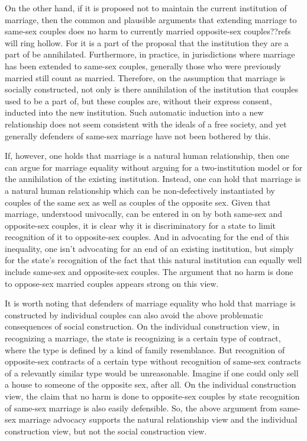 On the other hand, if it is proposed not to maintain the current institution of marriage, then the common and plausible
arguments that extending marriage to same-sex couples does no harm to currently married opposite-sex couples??refs will ring hollow. For it is a part of the proposal that the
institution they are a part of be annihilated. Furthermore, in practice, in jurisdictions where marriage has been extended to same-sex couples, generally those who were
previously married still count as married. Therefore, on the assumption that marriage is socially constructed, not only is there annihilation of the institution
that couples used to be a part of, but these couples are, without their express consent, inducted into the new institution. Such automatic induction into a new
relationship does not seem consistent with the ideals of a free society, and yet generally defenders of same-sex marriage have not been bothered by this.

If, however, one holds that marriage is a natural human relationship, then one can argue for marriage equality without arguing for a two-institution model or for
the annihilation of the existing institution. Instead, one can hold that marriage is a natural human relationship which can be non-defectively instantiated by
couples of the same sex as well as couples of the opposite sex. Given that marriage, understood univocally, can be entered in on by both same-sex and opposite-sex couples, it is clear why
it is discriminatory for a state to limit recognition of it to opposite-sex couples. And in advocating for the end of this inequality, one isn't advocating for an end of
an existing institution, but simply for the state's recognition of the fact that this natural institution can equally well include same-sex and opposite-sex couples. The argument that no harm is done to oppose-sex married couples appears strong on this view.

It is worth noting that defenders of marriage equality who  hold that marriage is constructed by individual couples can also avoid the above problematic consequences
of social construction. On the individual construction view, in recognizing a marriage, the state is recognizing is a certain type of contract, where the type is
defined by a kind of family resemblance. But recognition of opposite-sex contracts
of a certain type without recognition of same-sex contracts of a relevantly similar type would be unreasonable. Imagine if one could only sell a house to someone of
the opposite sex, after all. On the individual construction view, the claim that no harm is done to opposite-sex couples by state recognition of same-sex marriage is
also easily defensible. So, the above argument from same-sex marriage advocacy supports the natural relationship view and the individual construction view, but not the social
construction view.

